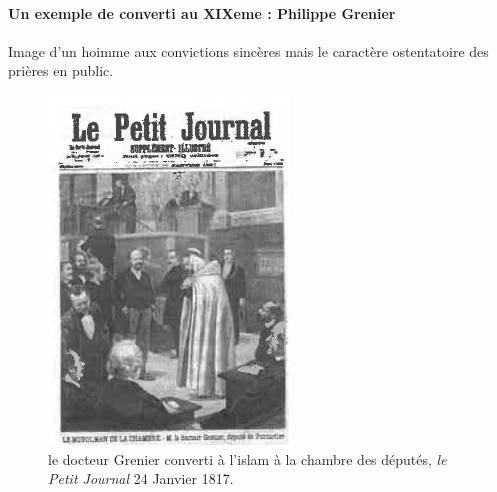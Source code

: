 \paragraph{Un exemple de converti au XIXeme : Philippe Grenier}
Image d'un hoimme aux convictions sincères mais le caractère ostentatoire des prières en public.
\begin{figure}
    \centering
    \includegraphics[width=\textwidth]{Images/DocteurGrenier.png}
    \caption{le docteur Grenier converti à l'islam à la chambre des députés, \textit{le Petit Journal}
24 Janvier 1817.}
    \label{fig:my_label}
\end{figure}

